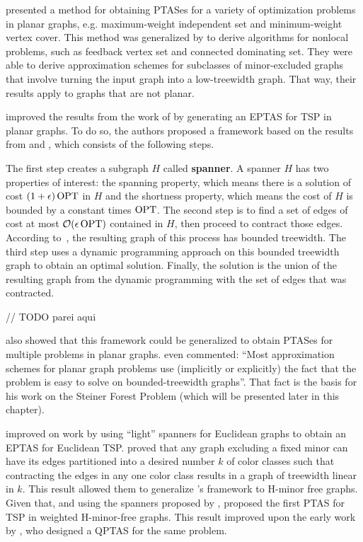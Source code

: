 \cite{baker1994} presented a method for obtaining PTASes for a variety of optimization problems in planar graphs, e.g. maximum-weight independent set and minimum-weight vertex cover. This method was generalized by \cite{demaine2005} to derive algorithms for nonlocal problems, such as feedback vertex set and connected dominating set. They were able to derive approximation schemes for subclasses of minor-excluded graphs that involve turning the input graph into a low-treewidth graph. That way, their results apply to graphs that are not planar.

\cite{KleinTSP} improved the results from the work of \cite{basicPTASplanarTSP} by generating an EPTAS for TSP in planar graphs. 
To do so, the authors proposed a framework based on the results from \cite{baker1994} and \cite{demaine2005}, which consists of the following steps.

The first step creates a subgraph \(H\) called \textbf{spanner}.
A spanner \(H\) has two properties of interest: the spanning property, which means there is a solution of cost \((1 + \epsilon) \operatorname{\textrm{OPT}}\) in \(H\) and the shortness property, which means the cost of \(H\) is bounded by a constant times \(\operatorname{\textrm{OPT}}\). The second step is to find a set of edges of cost at most \(\mathcal{O}(\epsilon \operatorname{\textrm{OPT}})\) contained in \(H\), then proceed to contract those edges. According to~\cite{Demaine2010}, the resulting graph of this process has bounded treewidth. The third step uses a dynamic programming approach on this bounded treewidth graph to obtain an optimal solution. Finally, the solution is the union of the resulting graph from the dynamic programming with the set of edges that was contracted.

// TODO parei aqui

\cite{KleinTSP} also showed that this framework could be generalized to obtain PTASes for multiple problems in planar graphs. \cite{Bateni} even commented: ``Most approximation schemes for planar graph problems use (implicitly or explicitly) the fact that the problem is easy to solve on bounded-treewidth graphs''. That fact is the basis for his work on the Steiner Forest Problem (which will be presented later in this chapter).

\cite{EPTASeuclidianTSP} improved on \cite{PTASeuclidianTSP} work by using ``light'' spanners for Euclidean graphs to obtain an EPTAS for Euclidean TSP.
\cite{contraction-decomposition-in-h-minor-free-graphs} proved that any graph excluding a fixed minor can have its edges partitioned into a desired number \(k\) of color classes such that contracting the edges in any one color class results in a graph of treewidth linear in \(k\). This result allowed them to generalize \citeauthor{KleinTSP}'s framework to H-minor free graphs. Given that, and using the spanners proposed by \cite{light_spanners_tsp}, \citeauthor{contraction-decomposition-in-h-minor-free-graphs} proposed the first PTAS for TSP in weighted H-minor-free graphs. This result improved upon the early work by \cite{light_spanners_tsp}, who designed a QPTAS for the same problem.

